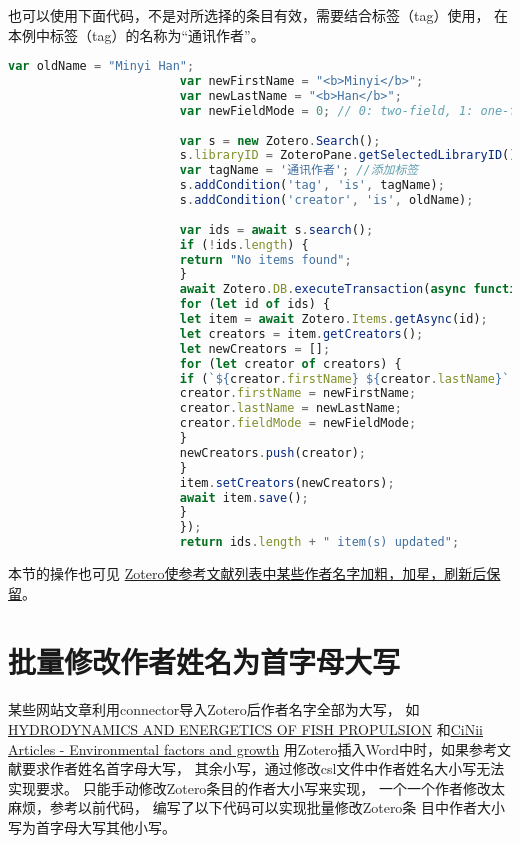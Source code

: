 \documentclass[cn,11pt,chinese]{elegantbook}
\begin{document}
			也可以使用下面代码，不是对所选择的条目有效，需要结合标签（tag）使用，
			在本例中标签（tag）的名称为“通讯作者”。
					\begin{lstlisting}[language=JavaScript]
						var oldName = "Minyi Han";
						var newFirstName = "<b>Minyi</b>";
						var newLastName = "<b>Han</b>";
						var newFieldMode = 0; // 0: two-field, 1: one-field (with empty first name)
						
						var s = new Zotero.Search();
						s.libraryID = ZoteroPane.getSelectedLibraryID();
						var tagName = '通讯作者'; //添加标签
						s.addCondition('tag', 'is', tagName);
						s.addCondition('creator', 'is', oldName);
						
						var ids = await s.search();
						if (!ids.length) {
						return "No items found";
						}
						await Zotero.DB.executeTransaction(async function () {
						for (let id of ids) {
						let item = await Zotero.Items.getAsync(id);
						let creators = item.getCreators();
						let newCreators = [];
						for (let creator of creators) {
						if (`${creator.firstName} ${creator.lastName}`.trim() == oldName) {
						creator.firstName = newFirstName;
						creator.lastName = newLastName;
						creator.fieldMode = newFieldMode;
						}
						newCreators.push(creator);
						}
						item.setCreators(newCreators);
						await item.save();
						}
						});
						return ids.length + " item(s) updated";
						\end{lstlisting}
				本节的操作也可见
				\href{https://zhuanlan.zhihu.com/p/353770101}
				{Zotero使参考文献列表中某些作者名字加粗，加星，刷新后保留}。

		\section{批量修改作者姓名为首字母大写}\label{sec:authorUpper}
			某些网站文章利用connector导入Zotero后作者名字全部为大写，
			如\href{https://pascal-francis.inist.fr/vibad/index.php?action=getRecordDetail&idt=PASCAL7536509928}
			{HYDRODYNAMICS AND ENERGETICS OF FISH PROPULSION}
			和\href{https://ci.nii.ac.jp/naid/10008557972/}
			{CiNii Articles - Environmental factors and growth}
			用Zotero插入Word中时，如果参考文献要求作者姓名首字母大写，
			其余小写，通过修改csl文件中作者姓名大小写无法实现要求。
			只能手动修改Zotero条目的作者大小写来实现，
			一个一个作者修改太麻烦，参考以前代码，
			编写了以下代码可以实现批量修改Zotero条
			目中作者大小写为首字母大写其他小写。
			
\end{document}
